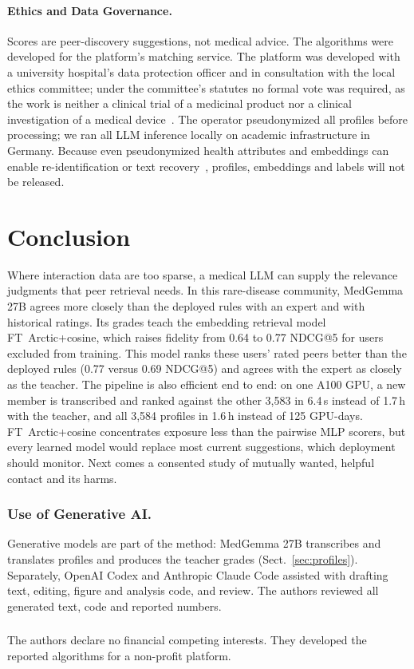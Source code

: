 \documentclass[runningheads,a4paper]{llncs}
\newcommand{\model}[1]{{\hyphenpenalty=10000 \exhyphenpenalty=10000 \textsf{#1}}}
\begin{document}
\paragraph{Ethics and Data Governance.}
Scores are peer-discovery suggestions, not medical advice.
The algorithms were developed for the platform's matching service. The
platform was developed with a university hospital's data protection officer
and in consultation with the local ethics committee; under the committee's
statutes no formal vote was required, as the work is neither a clinical trial of a
medicinal product nor a clinical investigation of a medical
device~\cite{fendrich2026development}.
The operator pseudonymized all profiles before processing; we ran all LLM
inference locally on academic infrastructure in Germany. Because even
pseudonymized health attributes and embeddings can enable re-identification or
text recovery~\cite{elemam2011reidentification,morris2023embeddings}, profiles,
embeddings and labels will not be released.

\section{Conclusion}
Where interaction data are too sparse, a medical LLM can supply the relevance
judgments that peer retrieval needs. In this rare-disease community, MedGemma
27B agrees more closely than the deployed rules with an expert and with
historical ratings. Its grades teach the embedding retrieval model \model{FT~Arctic+cosine}, which raises fidelity
from 0.64 to 0.77 NDCG@5 for users excluded from training. This model ranks
these users' rated peers better than the deployed rules (0.77 versus 0.69
NDCG@5) and agrees with the expert as closely as the teacher. The pipeline is
also efficient end to end: on one A100 GPU, a new member is transcribed and
ranked against the other 3,583 in 6.4\,s instead of 1.7\,h with the teacher,
and all 3,584 profiles in 1.6\,h instead of 125 GPU-days. \model{FT~Arctic+cosine}
concentrates exposure less than the pairwise MLP scorers, but every learned model would replace most current suggestions, which deployment should
monitor. Next comes a consented study of mutually wanted, helpful contact and
its harms.

\begin{credits}
\subsubsection{Use of Generative AI.}
Generative models are part of the method: MedGemma 27B transcribes and
translates profiles and produces the teacher grades (Sect.~\ref{sec:profiles}).
Separately, OpenAI Codex and Anthropic Claude Code assisted with drafting text,
editing, figure and analysis code, and review. The authors reviewed all
generated text, code and reported numbers.
\subsubsection{\discintname}
The authors declare no financial competing interests. They developed the
reported algorithms for a non-profit platform.
\end{credits}

\clearpage


\end{document}
